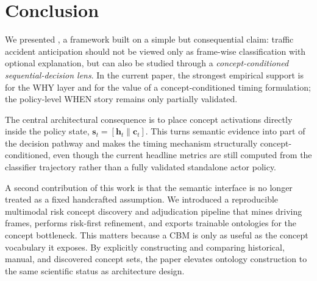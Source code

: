 \section{Conclusion}
\label{sec:conclusion}

We presented \method{}, a framework built on a simple but consequential claim:
traffic accident anticipation should not be viewed only as frame-wise
classification with optional explanation, but can also be studied through a
\emph{concept-conditioned sequential-decision lens}. In the current paper, the
strongest empirical support is for the WHY layer and for the value of a
concept-conditioned timing formulation; the policy-level WHEN story remains
only partially validated.

The central architectural consequence is to place concept activations directly
inside the policy state, $\mathbf{s}_t=[\mathbf{h}_t\|\mathbf{c}_t]$.
This turns semantic evidence into part of the decision pathway and makes the
timing mechanism structurally concept-conditioned, even though the current
headline metrics are still computed from the classifier trajectory rather than a
fully validated standalone actor policy.

A second contribution of this work is that the semantic interface is no longer
treated as a fixed handcrafted assumption. We introduced a reproducible
multimodal risk concept discovery and adjudication pipeline that mines driving
frames, performs risk-first refinement, and exports trainable ontologies for
the concept bottleneck. This matters because a CBM is only as useful as the
concept vocabulary it exposes. By explicitly constructing and comparing
historical, manual, and discovered concept sets, the paper elevates ontology
construction to the same scientific status as architecture design.

